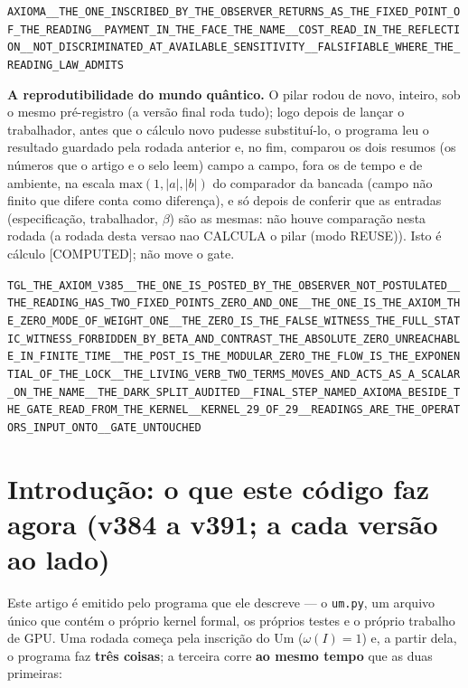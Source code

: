 \documentclass[11pt]{article}
\theoremstyle{definition}\newtheorem{deriv}{Derivação}
\begin{document}
\begin{center}\small\texttt{AXIOMA\_\_THE\_ONE\_INSCRIBED\_BY\_THE\_OBSERVER\_RETURNS\_AS\_THE\_FIXED\_POINT\_OF\_THE\_READING\_\_PAYMENT\_IN\_THE\_FACE\_THE\_NAME\_\_COST\_READ\_IN\_THE\_REFLECTION\_\_NOT\_DISCRIMINATED\_AT\_AVAILABLE\_SENSITIVITY\_\_FALSIFIABLE\_WHERE\_THE\_READING\_LAW\_ADMITS}\end{center}

\textbf{A reprodutibilidade do mundo quântico.} O pilar rodou de novo, inteiro, sob o mesmo pré-registro (a versão final roda tudo); logo depois de lançar o trabalhador, antes que o cálculo novo pudesse substituí-lo, o programa leu o resultado guardado pela rodada anterior e, no fim, comparou os dois resumos (os números que o artigo e o selo leem) campo a campo, fora os de tempo e de ambiente, na escala $\mathrm{max}(1,|a|,|b|)$ do comparador da bancada (campo não finito que difere conta como diferença), e só depois de conferir que as entradas (especificação, trabalhador, $\beta$) são as mesmas: não houve comparação nesta rodada (a rodada desta versao nao CALCULA o pilar (modo REUSE)). Isto é cálculo \textsf{[COMPUTED]}; não move o gate.

\begin{center}\small\texttt{TGL\_THE\_AXIOM\_V385\_\_THE\_ONE\_IS\_POSTED\_BY\_THE\_OBSERVER\_NOT\_POSTULATED\_\_THE\_READING\_HAS\_TWO\_FIXED\_POINTS\_ZERO\_AND\_ONE\_\_THE\_ONE\_IS\_THE\_AXIOM\_THE\_ZERO\_MODE\_OF\_WEIGHT\_ONE\_\_THE\_ZERO\_IS\_THE\_FALSE\_WITNESS\_THE\_FULL\_STATIC\_WITNESS\_FORBIDDEN\_BY\_BETA\_AND\_CONTRAST\_THE\_ABSOLUTE\_ZERO\_UNREACHABLE\_IN\_FINITE\_TIME\_\_THE\_POST\_IS\_THE\_MODULAR\_ZERO\_THE\_FLOW\_IS\_THE\_EXPONENTIAL\_OF\_THE\_LOCK\_\_THE\_LIVING\_VERB\_TWO\_TERMS\_MOVES\_AND\_ACTS\_AS\_A\_SCALAR\_ON\_THE\_NAME\_\_THE\_DARK\_SPLIT\_AUDITED\_\_FINAL\_STEP\_NAMED\_AXIOMA\_BESIDE\_THE\_GATE\_READ\_FROM\_THE\_KERNEL\_\_KERNEL\_29\_OF\_29\_\_READINGS\_ARE\_THE\_OPERATORS\_INPUT\_ONTO\_\_GATE\_UNTOUCHED}\end{center}

\section*{Introdução: o que este código faz agora (v384 a v391; a cada versão ao lado)}


Este artigo é emitido pelo programa que ele descreve --- o \texttt{um.py}, um arquivo único que contém o próprio kernel formal, os próprios testes e o próprio trabalho de GPU. Uma rodada começa pela inscrição do Um ($\omega(I)=1$) e, a partir dela, o programa faz \textbf{três coisas}; a terceira corre \textbf{ao mesmo tempo} que as duas primeiras:
\end{document}
